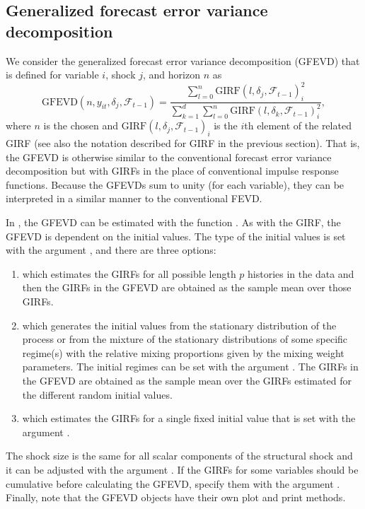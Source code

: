 \documentclass[nojss]{jss}
\begin{document}
\subsection{Generalized forecast error variance decomposition}
We consider the generalized forecast error variance decomposition (GFEVD) \citep{Lanne+Nyberg:2016}  that is defined for variable $i$, shock $j$, and horizon $n$ as
\begin{equation}
\text{GFEVD}(n,y_{it}, \delta_j,\mathcal{F}_{t-1}) = \frac{\sum_{l=0}^n\text{GIRF}(l,\delta_j,\mathcal{F}_{t-1})_i^2}{\sum_{k=1}^d\sum_{l=0}^n\text{GIRF}(l,\delta_k,\mathcal{F}_{t-1})_i^2},
\end{equation}
where $n$ is the chosen and $\text{GIRF}(l,\delta_j,\mathcal{F}_{t-1})_i$ is the $i$th element of the related GIRF (see also the notation described for GIRF in the previous section). That is, the GFEVD is otherwise similar to the conventional forecast error variance decomposition but with GIRFs in the place of conventional impulse response functions. Because the GFEVDs sum to unity (for each variable), they can be interpreted in a similar manner to the conventional FEVD.

In , the GFEVD can be estimated with the function . As with the GIRF, the GFEVD is dependent on the initial values. The type of the initial values is set with the argument , and there are three options:
\begin{enumerate}
\item {} which estimates the GIRFs for all possible length $p$ histories in the data and then the GIRFs in the GFEVD are obtained as the sample mean over those GIRFs.
\item {} which generates the initial values from the stationary distribution of the process or from the mixture of the stationary distributions of some specific regime(s) with the relative mixing proportions given by the mixing weight parameters. The initial regimes can be set with the argument . The GIRFs in the GFEVD are obtained as the sample mean over the GIRFs estimated for the different random initial values.
\item {} which estimates the GIRFs for a single fixed initial value that is set with the argument .
\end{enumerate}
The shock size is the same for all scalar components of the structural shock and it can be adjusted with the argument . If the GIRFs for some variables should be cumulative before calculating the GFEVD, specify them with the argument . Finally, note that the GFEVD objects have their own plot and print methods.
\end{document}
